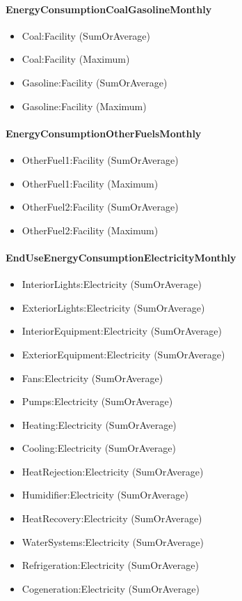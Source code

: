 \paragraph{EnergyConsumptionCoalGasolineMonthly}\label{energyconsumptioncoalgasolinemonthly}

\begin{itemize}
\item
  Coal:Facility (SumOrAverage)
\item
  Coal:Facility (Maximum)
\item
  Gasoline:Facility (SumOrAverage)
\item
  Gasoline:Facility (Maximum)
\end{itemize}

\paragraph{EnergyConsumptionOtherFuelsMonthly}\label{energyconsumptionotherfuelsmonthly}

\begin{itemize}
\item
  OtherFuel1:Facility (SumOrAverage)
\item
  OtherFuel1:Facility (Maximum)
\item
  OtherFuel2:Facility (SumOrAverage)
\item
  OtherFuel2:Facility (Maximum)
\end{itemize}

\paragraph{EndUseEnergyConsumptionElectricityMonthly}\label{enduseenergyconsumptionelectricitymonthly}

\begin{itemize}
\item
  InteriorLights:Electricity (SumOrAverage)
\item
  ExteriorLights:Electricity (SumOrAverage)
\item
  InteriorEquipment:Electricity (SumOrAverage)
\item
  ExteriorEquipment:Electricity (SumOrAverage)
\item
  Fans:Electricity (SumOrAverage)
\item
  Pumps:Electricity (SumOrAverage)
\item
  Heating:Electricity (SumOrAverage)
\item
  Cooling:Electricity (SumOrAverage)
\item
  HeatRejection:Electricity (SumOrAverage)
\item
  Humidifier:Electricity (SumOrAverage)
\item
  HeatRecovery:Electricity (SumOrAverage)
\item
  WaterSystems:Electricity (SumOrAverage)
\item
  Refrigeration:Electricity (SumOrAverage)
\item
  Cogeneration:Electricity (SumOrAverage)
\end{itemize}

